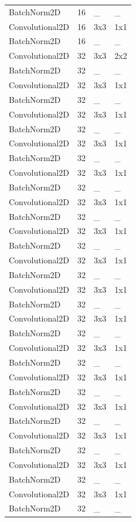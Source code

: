 \begin{center}
\begin{longtable}{|l|l|l|l|}
		BatchNorm2D & 16 & \_ & \_ \\
		Convolutional2D & 16 & 3x3 & 1x1 \\
		BatchNorm2D & 16 & \_ & \_ \\
		Convolutional2D & 32 & 3x3 & 2x2 \\
		BatchNorm2D & 32 & \_ & \_ \\
		Convolutional2D & 32 & 3x3 & 1x1 \\
		BatchNorm2D & 32 & \_ & \_ \\
		Convolutional2D & 32 & 3x3 & 1x1 \\
		BatchNorm2D & 32 & \_ & \_ \\
		Convolutional2D & 32 & 3x3 & 1x1 \\
		BatchNorm2D & 32 & \_ & \_ \\
		Convolutional2D & 32 & 3x3 & 1x1 \\
		BatchNorm2D & 32 & \_ & \_ \\
		Convolutional2D & 32 & 3x3 & 1x1 \\
		BatchNorm2D & 32 & \_ & \_ \\
		Convolutional2D & 32 & 3x3 & 1x1 \\
		BatchNorm2D & 32 & \_ & \_ \\
		Convolutional2D & 32 & 3x3 & 1x1 \\
		BatchNorm2D & 32 & \_ & \_ \\
		Convolutional2D & 32 & 3x3 & 1x1 \\
		BatchNorm2D & 32 & \_ & \_ \\
		Convolutional2D & 32 & 3x3 & 1x1 \\
		BatchNorm2D & 32 & \_ & \_ \\
		Convolutional2D & 32 & 3x3 & 1x1 \\
		BatchNorm2D & 32 & \_ & \_ \\
		Convolutional2D & 32 & 3x3 & 1x1 \\
		BatchNorm2D & 32 & \_ & \_ \\
		Convolutional2D & 32 & 3x3 & 1x1 \\
		BatchNorm2D & 32 & \_ & \_ \\
		Convolutional2D & 32 & 3x3 & 1x1 \\
		BatchNorm2D & 32 & \_ & \_ \\
		Convolutional2D & 32 & 3x3 & 1x1 \\
		BatchNorm2D & 32 & \_ & \_ \\
		Convolutional2D & 32 & 3x3 & 1x1 \\
		BatchNorm2D & 32 & \_ & \_ \\

\end{longtable}
\end{center}
